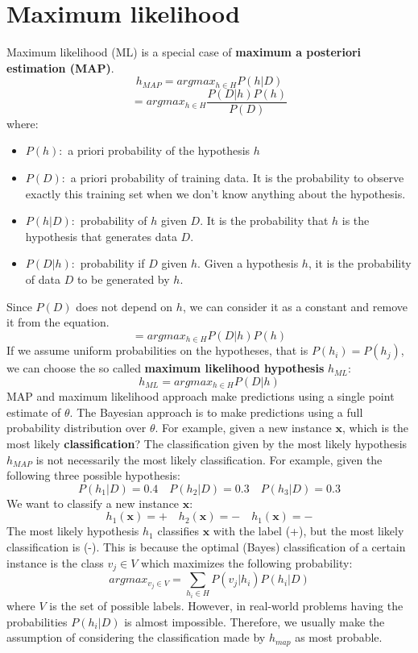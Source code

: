 \section{Maximum likelihood}
Maximum likelihood (ML) is a special case of \textbf{maximum a posteriori estimation (MAP)}.
\[h_{MAP} = argmax_{h \in H}P(h|D)\]
\[= argmax_{h \in H}\frac{P(D|h)P(h)}{P(D)}\]
where:
\begin{itemize}
    \item $P(h):$ a priori probability of the hypothesis $h$
    \item $P(D):$ a priori probability of training data. It is the probability to observe exactly this training set when we don't know anything about the hypothesis.
    \item $P(h|D):$ probability of $h$ given $D$. It is the probability that $h$ is the hypothesis that generates data $D$.
    \item $P(D|h):$ probability if $D$ given $h$. Given a hypothesis $h$, it is the probability of data $D$ to be generated by $h$.
\end{itemize}
Since $P(D)$ does not depend on $h$, we can consider it as a constant and remove it from the equation.
\[= argmax_{h \in H}P(D|h)P(h)\]
If we assume uniform probabilities on the hypotheses, that is $P(h_{i}) = P(h_{j})$, we can choose the so called \textbf{maximum likelihood hypothesis} $h_{ML}:$
\[h_{ML} = argmax_{h \in H}P(D|h)\]
MAP and maximum likelihood approach make predictions using a single point estimate of $\theta$. The Bayesian approach is to make predictions using a full probability distribution over $\theta$. For example, given a new instance $\textbf{x}$, which is the most likely \textbf{classification}? The classification given by the most likely hypothesis $h_{MAP}$ is not necessarily the most likely classification. For example, given the following three possible hypothesis:
 \[P(h_{1} | D) = 0.4 \quad P(h_{2} | D) = 0.3 \quad P(h_{3} | D) = 0.3\]
 We want to classify a new instance $\textbf{x}$:
 \[h_{1}(\textbf{x}) = + \quad h_{2}(\textbf{x}) = - \quad h_{1}(\textbf{x}) = -\]
 The most likely hypothesis $h_{1}$ classifies $\textbf{x}$ with the label (+), but the most likely classification is (-). This is because the optimal (Bayes) classification of a certain instance is the class $v_{j} \in V$ which maximizes the following probability:
 \[argmax_{v_{j} \in V} = \sum_{h_{i} \in H}P(v_{j} | h_{i})P(h_{i} | D)\]
 where $V$ is the set of possible labels.\newline\newline
 However, in real-world problems having the probabilities $P(h_{i} | D)$ is almost impossible. Therefore, we usually make the assumption of considering the classification made by $h_{map}$ as most probable.

